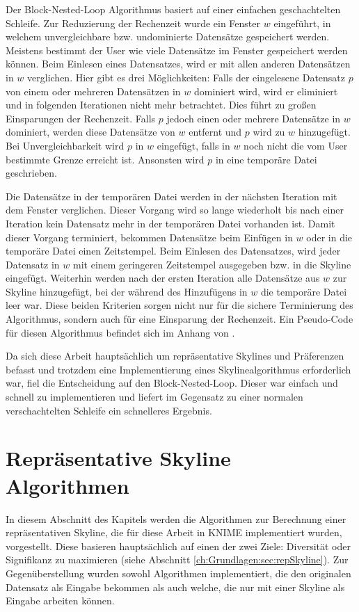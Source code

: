 Der Block-Nested-Loop Algorithmus basiert auf einer einfachen geschachtelten Schleife. Zur Reduzierung der Rechenzeit wurde ein Fenster $w$ eingeführt, in welchem unvergleichbare bzw. undominierte Datensätze gespeichert werden. Meistens bestimmt der User wie viele Datensätze im Fenster gespeichert werden können.
Beim Einlesen eines Datensatzes, wird er mit allen anderen Datensätzen in $w$ verglichen. Hier gibt es drei Möglichkeiten:
Falls der eingelesene Datensatz $p$ von einem oder mehreren Datensätzen in $w$ dominiert wird, wird er eliminiert und in folgenden Iterationen nicht mehr betrachtet. Dies führt zu großen Einsparungen der Rechenzeit. 
Falls $p$ jedoch einen oder mehrere Datensätze in $w$ dominiert, werden diese Datensätze von $w$ entfernt und $p$ wird zu $w$ hinzugefügt.
Bei Unvergleichbarkeit wird $p$ in $w$ eingefügt, falls in $w$ noch nicht die vom User bestimmte Grenze erreicht ist. Ansonsten wird $p$ in eine temporäre Datei geschrieben.

Die Datensätze in der temporären Datei werden in der nächsten Iteration mit dem Fenster verglichen. Dieser Vorgang wird so lange wiederholt bis nach einer Iteration kein Datensatz mehr in der temporären Datei vorhanden ist.
Damit dieser Vorgang terminiert, bekommen Datensätze beim Einfügen in $w$ oder in die temporäre Datei einen Zeitstempel. Beim Einlesen des Datensatzes, wird jeder Datensatz in $w$ mit einem geringeren Zeitstempel ausgegeben  bzw. in die Skyline eingefügt.
Weiterhin werden nach der ersten Iteration alle Datensätze aus $w$ zur Skyline hinzugefügt, bei der während des Hinzufügens in $w$ die temporäre Datei leer war.
Diese beiden Kriterien sorgen nicht nur für die sichere Terminierung des Algorithmus, sondern auch für eine Einsparung der Rechenzeit.
Ein Pseudo-Code für diesen Algorithmus befindet sich im Anhang von \cite{borzsony2001skyline}.

Da sich diese Arbeit hauptsächlich um repräsentative Skylines und Präferenzen befasst und trotzdem eine Implementierung eines Skylinealgorithmus erforderlich war, fiel die Entscheidung auf den Block-Nested-Loop. Dieser war einfach und schnell zu implementieren und liefert im Gegensatz zu einer normalen verschachtelten Schleife ein schnelleres Ergebnis.  
\section{Repräsentative Skyline Algorithmen}
\label{ch:Analyse:sec:repSkyAlgos}
In diesem Abschnitt des Kapitels werden die Algorithmen zur Berechnung einer repräsentativen Skyline, die für diese Arbeit in KNIME implementiert wurden, vorgestellt. 
Diese basieren hauptsächlich auf einen der zwei Ziele: Diversität oder Signifikanz zu maximieren (siehe Abschnitt \ref{ch:Grundlagen:sec:repSkyline}).
Zur Gegenüberstellung wurden sowohl Algorithmen implementiert, die den originalen Datensatz als Eingabe bekommen als auch welche, die nur mit einer Skyline als Eingabe arbeiten können.
